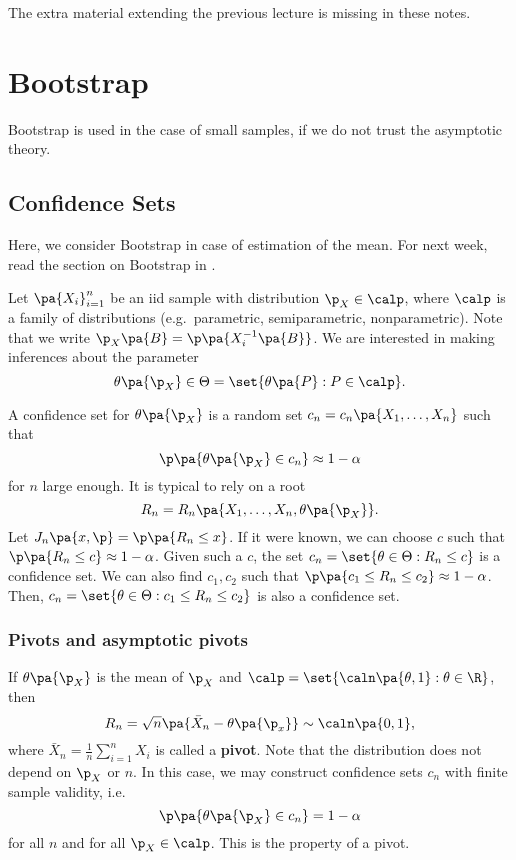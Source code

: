 \newpage
{}
{\color{red}The extra material extending the previous lecture is missing in these notes.}

\section{Bootstrap}
Bootstrap is used in the case of small samples, if we do not trust the asymptotic theory.
\subsection{Confidence Sets}
Here, we consider Bootstrap in case of estimation of the mean. {\color{red}For next week, read the section on Bootstrap in \cite{Hansen_econometrics}.}

Let $\pa{X_i}_{i=1}^n$ be an iid sample with distribution $\p_X\in\calp$, where $\calp$ is a family of distributions (e.g.~parametric, semiparametric, nonparametric). Note that we write $\p_X\pa{B} = \p\pa{X_i^{-1}\pa{B}}$. We are interested in making inferences about the parameter
\begin{equation}
  \theta\pa{\p_X} \in \Theta = \set{\theta\pa{P}: P\in \calp}.
\end{equation}

A confidence set for $\theta\pa{\p_X}$ is a random set $c_n = c_n \pa{X_1,\ldots, X_n}$ such that
\begin{equation}
  \p\pa{\theta\pa{\p_X} \in c_n} \approx 1-\alpha
\end{equation}
for $n$ large enough. It is typical to rely on a root
\begin{equation}
  R_n = R_n \pa{X_1,\ldots, X_n,\theta\pa{\p_X}}.
\end{equation}
Let $J_n \pa{x,\p} = \p\pa{R_n \leq x}$. If it were known, we can choose $c$ such that $\p\pa{R_n\leq c}\approx 1-\alpha$. Given such a $c$, the set $c_n = \set{\theta\in \Theta: R_n \leq c}$ is a confidence set.  We can also find $c_1,c_2$ such that $\p\pa{c_1\leq R_n \leq c_2}\approx 1-\alpha$.  Then, $c_n = \set{\theta\in \Theta: c_1 \leq R_n \leq c_2}$ is also a confidence set.

\subsubsection{Pivots and asymptotic pivots}
If $\theta\pa{\p_X}$ is the mean of $\p_X$ and $\calp = \set{\caln \pa{\theta,1}:\theta\in \R}$, then
\begin{equation}
  R_n = \sqrt{n} \pa{\bar{X}_n -\theta\pa{\p_x}}\sim \caln\pa{0,1},
\end{equation}
where $\bar{X}_n = \frac{1}{n}\sum_{i=1}^n X_i$ is called a \textbf{pivot}. Note that the distribution does not depend on $\p_X$ or $n$. In this case, we may construct confidence sets $c_n$ with finite sample validity, i.e.
\begin{equation}
\p\pa{\theta\pa{\p_X}\in c_n}= 1-\alpha
\end{equation}
for all $n$ and for all $\p_X\in \calp$. This is the property of a pivot.

